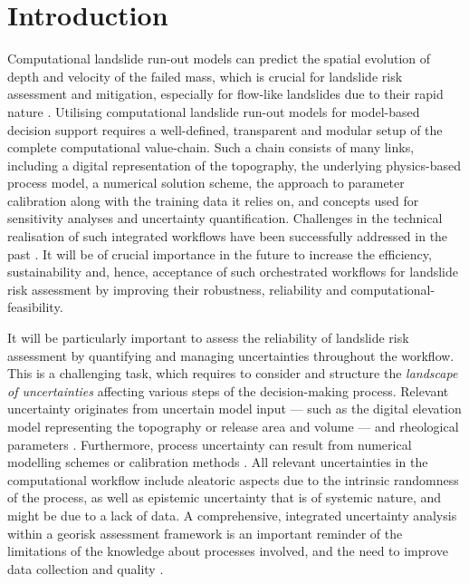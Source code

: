 \documentclass[utf8]{FrontiersinHarvard}
\begin{document}

\section{Introduction}

Computational landslide run-out models can predict the spatial evolution of depth and velocity of the failed mass, which is crucial for landslide risk assessment and mitigation, especially for flow-like landslides due to their rapid nature \citep{Cepeda2013,McDougall2017}. Utilising computational landslide run-out models for model-based decision support requires a well-defined, transparent and modular setup of the complete computational value-chain. Such a chain consists of many links, including a digital representation of the topography, the underlying physics-based process model, a numerical solution scheme, the approach to parameter calibration along with the training data it relies on, and concepts used for sensitivity analyses and uncertainty quantification. Challenges in the technical realisation of such integrated workflows have been successfully addressed in the past \citep{Dalbey2008, Aaron2019, Sun2021b, Zhao2021, Aaron2022, Zhao2022}. It will be of crucial importance in the future to increase the efficiency, sustainability and, hence, acceptance of such orchestrated workflows for landslide risk assessment by improving their robustness, reliability and computational-feasibility.

It will be particularly important to assess the reliability of landslide risk assessment by quantifying and managing uncertainties throughout the workflow. This is a challenging task, which requires to consider and structure the \textit{landscape of uncertainties} affecting various steps of the decision-making process. Relevant uncertainty originates from  uncertain model input --- such as the digital elevation model representing the topography \citep{Zhao2020} or release area and volume --- and rheological parameters \citep{Quan2013}. Furthermore, process uncertainty can result from numerical modelling schemes \citep{Schraml2015} or calibration methods \citep{Aaron2019, Aaron2022}. All relevant uncertainties in the computational workflow include aleatoric aspects due to the intrinsic randomness of the process, as well as epistemic uncertainty that is of systemic nature, and might be due to a lack of data. A comprehensive, integrated uncertainty analysis within a georisk assessment framework is an important reminder of the limitations of the knowledge about processes involved, and the need to improve data collection and quality \citep{Eidsvig2014}.
\end{document}
